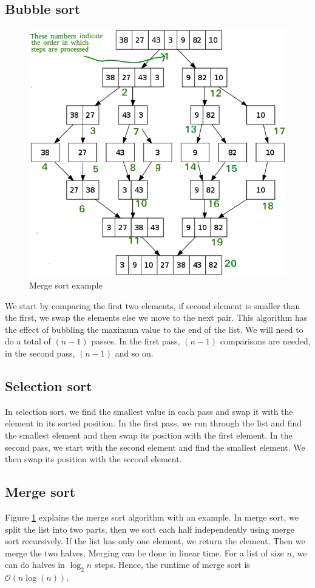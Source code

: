 \documentclass[11pt]{article}
\begin{document}
\subsection*{Bubble sort}
\begin{figure}
	\centering
	\includegraphics[width=0.9\linewidth]{figures/merge-sort}
	\caption{Merge sort example}
	\label{fig: merge-sort}
\end{figure}
We start by comparing the first two elements, if second element is smaller than the first, we swap the elements else we move to the next pair. This algorithm has the effect of bubbling the maximum value to the end of the list. We will need to do a total of $(n-1)$ passes. In the first pass, $(n-1)$ comparisons are needed, in the second pass, $(n-1)$ and so on. 



\subsection*{Selection sort}
In selection sort, we find the smallest value in each pass and swap it with the element in its sorted position. In the first pass, we run through the list and find the smallest element and then swap its position with the first element. In the second pass, we start with the second element and find the smallest element. We then swap its position with the second element. 

\subsection*{Merge sort}
Figure \ref{fig: merge-sort} explains the merge sort algorithm with an example. In merge sort, we split the list into two parts, then we sort each half independently using merge sort recursively. If the list has only one element, we return the element. Then we merge the two halves. Merging can be done in linear time. For a list of size $n$, we can do halves in $\log_2n$ steps. Hence, the runtime of merge sort is $\mathcal{O}\left(n\log(n)\right)$.
\end{document}
